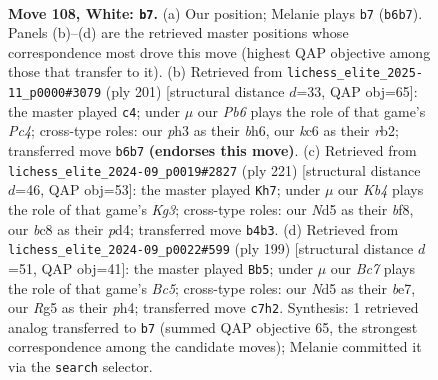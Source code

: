 \documentclass[11pt]{article}
\begin{document}
\clearpage

\begin{figure}[p]\centering
\begin{subfigure}{0.46\textwidth}\centering
\resizebox{\linewidth}{!}{%
\newchessgame
\chessboard[
  setfen={2b5/2B5/PPk5/3N2R1/1K6/7p/8/8 w - - 3 108},
  showmover=false,
  pgfstyle=straightmove, color=movearrow, markmove={b6-b7}
]}
\caption{}
\end{subfigure}\hfill
\begin{subfigure}{0.46\textwidth}\centering
\resizebox{\linewidth}{!}{%
\newchessgame
\chessboard[
  setfen={8/8/pK5B/Pbp5/8/1n6/1R6/3k4 b - - 80 101},
  showmover=false,
  pgfstyle=straightmove, color=movearrow, markmove={c5-c4}
]}
\caption{}
\end{subfigure}
\\[4pt]
\begin{subfigure}{0.46\textwidth}\centering
\resizebox{\linewidth}{!}{%
\newchessgame
\chessboard[
  setfen={5B2/8/2pKp1kP/3b4/3P4/8/8/8 b - - 0 111},
  showmover=false,
  pgfstyle=straightmove, color=movearrow, markmove={g6-h7}
]}
\caption{}
\end{subfigure}\hfill
\begin{subfigure}{0.46\textwidth}\centering
\resizebox{\linewidth}{!}{%
\newchessgame
\chessboard[
  setfen={8/4B3/8/3k3p/p1b4P/P1Kp4/8/8 b - - 31 100},
  showmover=false,
  pgfstyle=straightmove, color=movearrow, markmove={c4-b5}
]}
\caption{}
\end{subfigure}
\caption{\textbf{Move 108, White: \texttt{b7}.} (a) Our position; Melanie plays \texttt{b7} (\texttt{b6b7}). Panels (b)--(d) are the retrieved master positions whose correspondence most drove this move (highest QAP objective among those that transfer to it). (b) Retrieved from \texttt{lichess\_elite\_2025-11\_p0000\#3079} (ply 201) [structural distance $d$=33, QAP obj=65]: the master played \texttt{c4}; under $\mu$ our \emph{Pb6} plays the role of that game's \emph{Pc4}; cross-type roles: our \emph{p}h3 as their \emph{b}h6, our \emph{k}c6 as their \emph{r}b2; transferred move \texttt{b6b7} \textbf{(endorses this move)}. (c) Retrieved from \texttt{lichess\_elite\_2024-09\_p0019\#2827} (ply 221) [structural distance $d$=46, QAP obj=53]: the master played \texttt{Kh7}; under $\mu$ our \emph{Kb4} plays the role of that game's \emph{Kg3}; cross-type roles: our \emph{N}d5 as their \emph{b}f8, our \emph{b}c8 as their \emph{p}d4; transferred move \texttt{b4b3}. (d) Retrieved from \texttt{lichess\_elite\_2024-09\_p0022\#599} (ply 199) [structural distance $d$=51, QAP obj=41]: the master played \texttt{Bb5}; under $\mu$ our \emph{Bc7} plays the role of that game's \emph{Bc5}; cross-type roles: our \emph{N}d5 as their \emph{b}e7, our \emph{R}g5 as their \emph{p}h4; transferred move \texttt{c7h2}. Synthesis: 1 retrieved analog transferred to \texttt{b7} (summed QAP objective 65, the strongest correspondence among the candidate moves); Melanie committed it via the \texttt{search} selector.}
\label{fig:thought-m214}
\end{figure}
\end{document}

